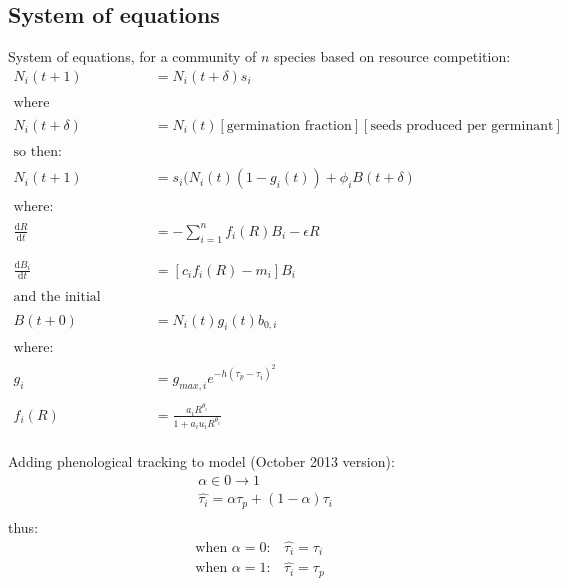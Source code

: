\documentclass[11pt,a4paper,oneside]{article}
\begin{document}
\subsection{System of equations}
\noindent System of equations, for a community of \(n\) species based
on resource competition:
\begin{align*}
N_{i}(t+1) & = N_{i}(t+\delta)s_{i}
\\
\\
\text{where}
\\
\\
N_{i}(t+\delta) & = N_{i}(t) [\text{germination fraction}][\text{seeds
  produced per germinant}]
\\
\\
\text{so then:}
\\
\\
N_{i}(t+1) & =
s_{i}(N_{i}(t)(1-g_{i}(t))+\phi_{i}B(t+\delta)
\\
\\
\text{where:}\\
\\
\frac{\mathrm{d}R}{\mathrm{d}t} & = - \sum_{i=1}^{n}f_{i}(R)B_{i} -\epsilon R\\
\\
\\
\frac{\mathrm{d}B_{i}}{\mathrm{d}t} &  = [c_{i}f_{i}(R) - m_{i}]B_{i}
\\
\\
\text{and the initial condition is:}\\
\\
B(t+0) & = N_{i}(t)g_{i}(t)b_{0,i}
\\
\\
\text{where:} 
\\
\\
g_{i} & = g_{max,i}e^{-h(\tau_{p}-\tau_{i})^2}
\\
\\
f_{i}(R) & = \frac{a_{i}R^{\theta_{i}}}{1+a_{i}u_{i}R^{\theta_{i}}}
\\
\end{align*}

\noindent Adding phenological tracking to model (October 2013 version): \\
\begin{align*}
& \alpha \in 0 \rightarrow 1
\\
&\hat{\tau_{i}} = \alpha \tau_{p} + (1-\alpha)\tau_{i}\\
\end{align*}
\noindent thus:
\begin{align*}
\text{when } \alpha = 0: & \hat{\tau_{i}}=\tau_{i}
\\
\text{when }  \alpha = 1: & \hat{\tau_{i}}=\tau_{p}
\end{align*}
\end{document}
